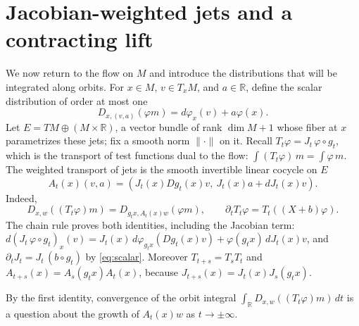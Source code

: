 \documentclass[12pt]{article}
\theoremstyle{remark}
\newcommand{\R}{\mathbb R}
\begin{document}
\section{Jacobian-weighted jets and a contracting lift}
\label{sec:jets}

We now return to the flow on \(M\) and introduce the distributions
that will be integrated along orbits.
For \(x\in M\), \(v\in T_xM\), and \(a\in\R\), define the scalar
distribution of order at most one
\[
 D_{x,(v,a)}(\varphi m)=d\varphi_x(v)+a\varphi(x).
\]
Let \(E=TM\oplus(M\times\R)\), a vector bundle of rank
\(\dim M+1\) whose fiber at \(x\) parametrizes these jets; fix a
smooth norm \(\|\cdot\|\) on it.
Recall \(T_t\varphi=J_t\,\varphi\circ g_t\), which is the transport of
test functions dual to the flow: \(\int(T_t\varphi)\,m=\int\varphi\,m\).
The weighted transport of jets is the smooth invertible
linear cocycle on \(E\)
\begin{equation}\label{eq:jet-cocycle}
 A_t(x)(v,a)=
 \left(J_t(x)Dg_t(x)v,\ J_t(x)a+dJ_t(x)v\right).
\end{equation}
Indeed,
\begin{equation}\label{eq:jet-transport}
 D_{x,w}((T_t\varphi)m)
       =D_{g_tx,A_t(x)w}(\varphi m),\qquad
 \partial_t T_t\varphi=T_t((X+b)\varphi).
\end{equation}
The chain rule proves both identities, including the Jacobian term:
\(d(J_t\,\varphi\circ g_t)_x(v)=J_t(x)\,d\varphi_{g_tx}(Dg_t(x)v)
+\varphi(g_tx)\,dJ_t(x)v\), and
\(\partial_tJ_t=J_t\,(b\circ g_t)\) by \eqref{eq:scalar}.
Moreover \(T_{t+s}=T_sT_t\) and
\(A_{t+s}(x)=A_s(g_tx)A_t(x)\), because
\(J_{t+s}(x)=J_t(x)J_s(g_tx)\).

By the first identity, convergence of the orbit integral
\(\int_\R D_{x,w}((T_t\varphi)m)\,dt\) is a question about the growth
of \(A_t(x)w\) as \(t\to\pm\infty\).
\end{document}

